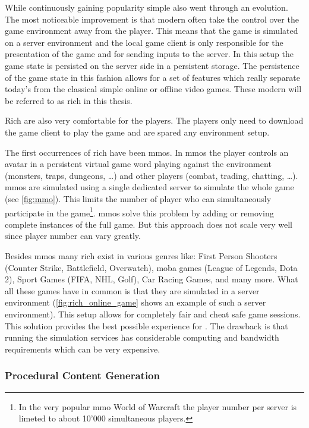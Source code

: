 While continuously gaining popularity simple \ogs{} also went through an
evolution. The most noticeable improvement is that modern \ogs{} often take the
control over the game environment away from the player. This means that the game
is simulated on a server environment and the local game client is only
responsible for the presentation of the game and for sending inputs to the
server. In this setup the game state is persisted on the server side in a
persistent storage. The persistence of the game state in this fashion allows for
a set of features which really separate today's \ogs{} from the classical simple
online or offline video games. These modern \ogs{} will be referred to as rich
\og{} in this thesis.

Rich \ogs{} are also very comfortable for the players. The players only need to
download the game client to play the game and are spared any environment setup.

The first occurrences of rich \og{} have been \glspl{mmo}. In \glspl{mmo} the
player controls an avatar in a persistent virtual game word playing against the
environment (monsters, traps, dungeons, \ldots) and other players (combat,
trading, chatting, \ldots). \glspl{mmo} are simulated using a single dedicated
server to simulate the whole game (see \autoref{fig:mmo}). This limits the
number of player who can simultaneously participate in the game\footnote{In the
very popular \gls{mmo} World of Warcraft the player number per server is
limeted to about 10'000 simultaneous players.}. \glspl{mmo} solve this problem
by adding or removing complete instances of the full game. But this approach
does not scale very well since player number can vary greatly.

Besides \glspl{mmo} many rich \ogs{} exist in various genres like: First Person
Shooters (Counter Strike, Battlefield, Overwatch), \gls{moba} games (League of
Legends, Dota 2), Sport Games (FIFA, NHL, Golf), Car Racing Games, and many
more. What all these games have in common is that they are simulated in a server
environment (\autoref{fig:rich_online_game} shows an example of such a server
environment). This setup allows for completely fair and cheat safe game
sessions. This solution provides the best possible experience for \ogs{}. The
drawback is that running the simulation services has considerable computing and
bandwidth requirements which can be very expensive.

\subsubsection{Procedural Content Generation}

